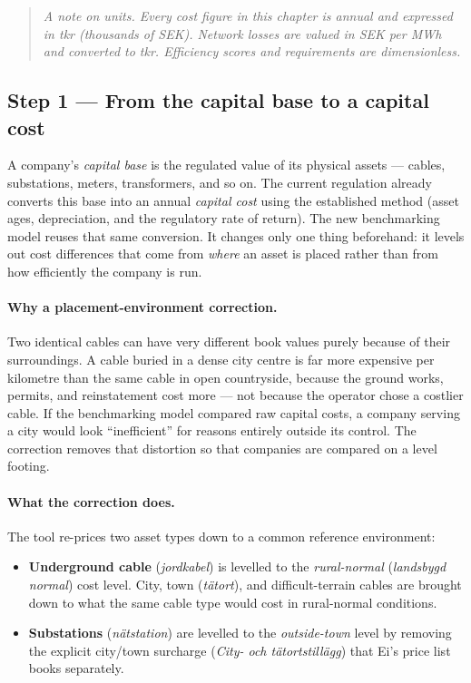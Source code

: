 \begin{quote}
\small\itshape
A note on units. Every cost figure in this chapter is annual and expressed in
\emph{tkr} (thousands of SEK). Network losses are valued in SEK per MWh and
converted to tkr. Efficiency scores and requirements are dimensionless.
\end{quote}


\subsection{Step 1 --- From the capital base to a capital cost}
\label{sec:step1}

A company's \emph{capital base} is the regulated value of its physical assets ---
cables, substations, meters, transformers, and so on. The current regulation
already converts this base into an annual \emph{capital cost} using the
established method (asset ages, depreciation, and the regulatory rate of return).
The new benchmarking model reuses that same conversion. It changes only one thing
beforehand: it levels out cost differences that come from \emph{where} an asset
is placed rather than from how efficiently the company is run.

\paragraph{Why a placement-environment correction.}
Two identical cables can have very different book values purely because of their
surroundings. A cable buried in a dense city centre is far more expensive per
kilometre than the same cable in open countryside, because the ground works,
permits, and reinstatement cost more --- not because the operator chose a costlier
cable. If the benchmarking model compared raw capital costs, a company serving a
city would look ``inefficient'' for reasons entirely outside its control. The
correction removes that distortion so that companies are compared on a level
footing.

\paragraph{What the correction does.}
The tool re-prices two asset types down to a common reference environment:

\begin{itemize}
  \item \textbf{Underground cable} (\emph{jordkabel}) is levelled to the
        \emph{rural-normal} (\emph{landsbygd normal}) cost level. City, town
        (\emph{tätort}), and difficult-terrain cables are brought down to what the
        same cable type would cost in rural-normal conditions.
  \item \textbf{Substations} (\emph{nätstation}) are levelled to the
        \emph{outside-town} level by removing the explicit city/town surcharge
        (\emph{City- och tätortstillägg}) that Ei's price list books separately.
\end{itemize}


